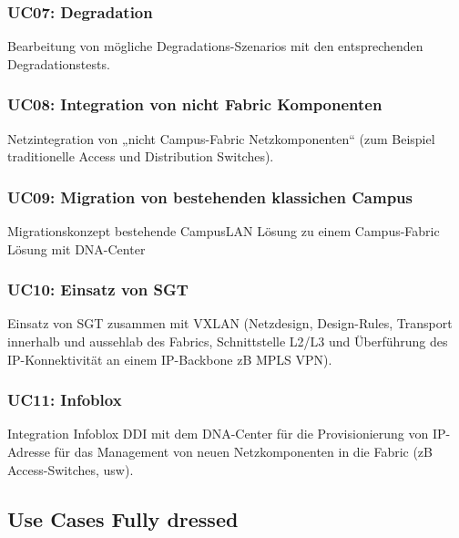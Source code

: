 \subsubsection{UC07: Degradation}
Bearbeitung von mögliche Degradations-Szenarios mit den entsprechenden Degradationstests.

\subsubsection{UC08: Integration von nicht Fabric Komponenten}
Netzintegration von „nicht Campus-Fabric Netzkomponenten“ (zum Beispiel traditionelle Access und Distribution Switches).

\subsubsection{UC09:  Migration von bestehenden klassichen Campus}
Migrationskonzept bestehende CampusLAN Lösung zu einem Campus-Fabric Lösung mit DNA-Center

\subsubsection{UC10: Einsatz von SGT}
Einsatz von SGT zusammen mit VXLAN (Netzdesign, Design-Rules, Transport innerhalb und aussehlab des Fabrics, Schnittstelle L2/L3 und Überführung des IP-Konnektivität an einem IP-Backbone zB MPLS VPN).

\subsubsection{UC11: Infoblox}
Integration Infoblox DDI mit dem DNA-Center für die Provisionierung von IP-Adresse für das Management von neuen Netzkomponenten in die Fabric (zB Access-Switches, usw).

\subsection{Use Cases Fully dressed}
